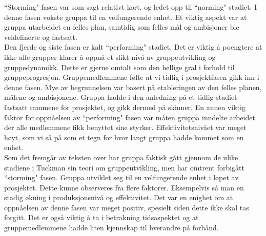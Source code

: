 ``Storming" fasen var som sagt relativt kort, og ledet opp til ``norming" stadiet. I denne fasen vokste gruppa til en velfungerende enhet. Et viktig aspekt var at gruppa utarbeidet en felles plan, samtidig som felles mål og ambisjoner ble veldefinerte og fastsatt.\\

Den fjerde og siste fasen er kalt ``performing" stadiet. Det er viktig å poengtere at ikke alle grupper klarer å oppnå et slikt nivå av gruppeutvikling og gruppedynamikk. Dette er gjerne omtalt som den hellige gral i forhold til gruppeprogresjon. Gruppemedlemmene følte at vi tidlig i prosjektfasen gikk inn i denne fasen. Mye av begrunnelsen var basert på etableringen av den felles planen, målene og ambisjonene. Gruppa hadde i den anledning på et tidlig stadiet fastsatt rammene for prosjektet, og gikk dermed på skinner. En annen viktig faktor for oppnåelsen av ``performing" fasen var måten gruppa inndelte arbeidet der alle medlemmene fikk benyttet sine styrker. Effektivitetsnivået var meget høyt, som vi så på som et tegn for hvor langt gruppa hadde kommet som en enhet.\\

Som det fremgår av teksten over har gruppa faktisk gått gjennom de ulike stadiene i Tuckman sin teori om gruppeutvikling, men har omtrent forbigått ``storming" fasen. Gruppa utviklet seg til en velfungerende enhet i løpet av prosjektet. Dette kunne observeres fra flere faktorer. Eksempelvis så man en stadig økning i produksjonsnivå og effektivitet. Det var en enighet om at oppnåelsen av denne fasen var meget positiv, spesielt siden dette ikke skal tas forgitt. Det er også viktig å ta i betrakning tidsaspektet og at gruppemedlemmene hadde liten kjennskap til hverandre på forhånd.\\
